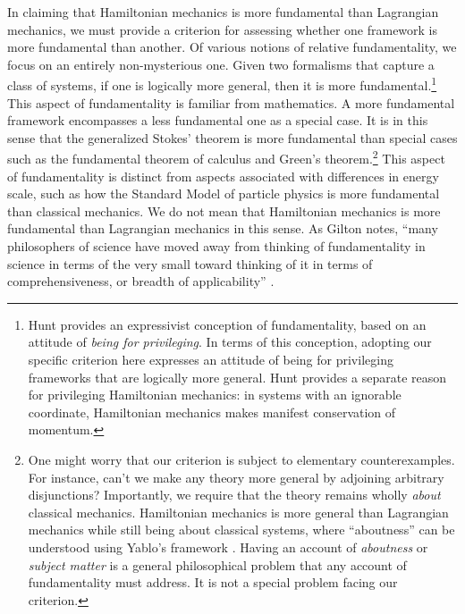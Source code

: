 \documentclass[12pt, twoside]{article}
\begin{document}
In claiming that Hamiltonian mechanics is more fundamental than Lagrangian mechanics, we must provide a criterion for assessing whether one framework is more fundamental than another. Of various notions of relative fundamentality, we focus on an entirely non-mysterious one. Given two formalisms that capture a class of systems, if one is logically more general, then it is more fundamental.\footnote{Hunt \parencites*[Ch. 5]{Huntthesis} provides an expressivist conception of fundamentality, based on an attitude of \textit{being for privileging}. In terms of this conception, adopting our specific criterion here expresses an attitude of being for privileging frameworks that are logically more general. Hunt \parencites*[816]{HuntPSA} provides a separate reason for privileging Hamiltonian mechanics: in systems with an ignorable coordinate, Hamiltonian mechanics makes manifest conservation of momentum.} This aspect of fundamentality is familiar from mathematics. A more fundamental framework encompasses a less fundamental one as a special case. It is in this sense that the generalized Stokes' theorem is more fundamental than special cases such as the fundamental theorem of calculus and Green's theorem.\footnote{One might worry that our criterion is subject to elementary counterexamples. For instance, can't we make any theory more general by adjoining arbitrary disjunctions? Importantly, we require that the theory remains wholly \textit{about} classical mechanics. Hamiltonian mechanics is more general than Lagrangian mechanics while still being about classical systems, where ``aboutness'' can be understood using Yablo's framework \parencites*[]{Yablo}. Having an account of \textit{aboutness} or \textit{subject matter} is a general philosophical problem that any account of fundamentality must address. It is not a special problem facing our criterion.}  This aspect of fundamentality is distinct from aspects associated with differences in energy scale, such as how the Standard Model of particle physics is more fundamental than classical mechanics. We do not mean that Hamiltonian mechanics is more fundamental than Lagrangian mechanics in this sense. As Gilton notes, ``many philosophers of science have moved away from thinking of fundamentality in science in terms of the very small toward thinking of it in terms of comprehensiveness, or breadth of applicability'' \parencites*[637]{Gilton2021}.
\end{document}

